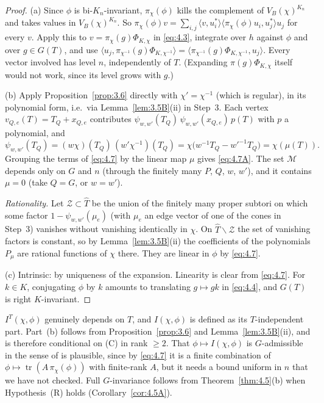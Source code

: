 \documentclass[12pt,letterpaper]{article}
\numberwithin{equation}{section}
\theoremstyle{plain}
\theoremstyle{remark}
\theoremstyle{plain}
\theoremstyle{definition}
\theoremstyle{remark}
\theoremstyle{remark}
\newcommand{\ip}[1]{\langle #1\rangle}
\newcommand{\Th}{\widehat{T}}
\DeclareMathOperator{\tr}{tr}
\begin{document}
\begin{proof}
(a) Since $\phi$ is bi-$K_n$-invariant, $\pi_\chi(\phi)$ kills the complement of $V_B(\chi)^{K_n}$ and takes values in $V_B(\chi)^{K_n}$. So $\pi_\chi(\phi)v=\sum_{i,j}\ip{v,u_i^*}\ip{\pi_\chi(\phi)u_i,u_j^*}u_j$ for every $v$. Apply this to $v=\pi_\chi(g)\Phi_{K,\chi}$ in \eqref{eq:4.3}, integrate over $h$ against $\phi$ and over $g\in G(T)$, and use $\ip{u_j,\pi_{\chi^{-1}}(g)\Phi_{K,\chi^{-1}}}=\ip{\pi_{\chi^{-1}}(g)\Phi_{K,\chi^{-1}},u_j}$. Every vector involved has level $n$, independently of $T$. (Expanding $\pi(g)\Phi_{K,\chi}$ itself would not work, since its level grows with $g$.)

(b) Apply Proposition~\ref{prop:3.6} directly with $\chi'=\chi^{-1}$ (which is regular), in its polynomial form, i.e.\ via Lemma~\ref{lem:3.5B}(ii) in Step~3. Each vertex $v_{Q,e}(T)=T_Q+x_{Q,e}$ contributes $\psi_{w,w'}(T_Q)\,\psi_{w,w'}(x_{Q,e})\,p(T)$ with $p$ a polynomial, and
\[
\psi_{w,w'}(T_Q)=(w\chi)(T_Q)\,(w'\chi^{-1})(T_Q)=\chi\big(w^{-1}T_Q-w'^{-1}T_Q\big)=\chi(\mu(T)).
\]
Grouping the terms of \eqref{eq:4.7} by the linear map $\mu$ gives \eqref{eq:4.7A}. The set $\mathcal M$ depends only on $G$ and $n$ (through the finitely many $P$, $Q$, $w$, $w'$), and it contains $\mu=0$ (take $Q=G$, or $w=w'$).

\emph{Rationality.} Let $\mathcal Z\subset\Th$ be the union of the finitely many proper subtori on which some factor $1-\psi_{w,w'}(\mu_e)$ (with $\mu_e$ an edge vector of one of the cones in Step~3) vanishes without vanishing identically in $\chi$. On $\Th\smallsetminus\mathcal Z$ the set of vanishing factors is constant, so by Lemma~\ref{lem:3.5B}(ii) the coefficients of the polynomials $P_\mu$ are rational functions of $\chi$ there. They are linear in $\phi$ by \eqref{eq:4.7}.

(c) Intrinsic: by uniqueness of the expansion. Linearity is clear from \eqref{eq:4.7}. For $k\in K$, conjugating $\phi$ by $k$ amounts to translating $g\mapsto gk$ in \eqref{eq:4.4}, and $G(T)$ is right $K$-invariant.
\end{proof}

\begin{rem26}\label{r:P42}
$I^T(\chi,\phi)$ genuinely depends on $T$, and $I(\chi,\phi)$ is defined as its $T$-independent part. Part~(b) follows from Proposition~\ref{prop:3.6} and Lemma~\ref{lem:3.5B}(ii), and is therefore conditional on (C) in rank $\ge2$. That $\phi\mapsto I(\chi,\phi)$ is $G$-admissible in the sense of \cite[\S14]{HC78} is plausible, since by \eqref{eq:4.7} it is a finite combination of $\phi\mapsto\tr(A\,\pi_\chi(\phi))$ with finite-rank $A$, but it needs a bound uniform in $n$ that we have not checked. Full $G$-invariance follows from Theorem~\ref{thm:4.5}(b) when Hypothesis~(R) holds (Corollary~\ref{cor:4.5A}).
\end{rem26}
\end{document}
